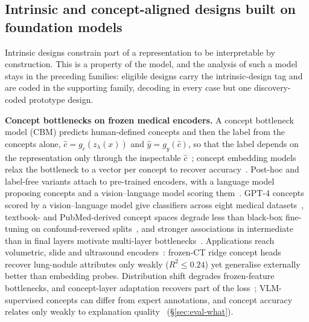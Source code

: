 \subsection{Intrinsic and concept-aligned designs built on foundation models}
\label{sec:intrinsic}

Intrinsic designs constrain part of a representation to be interpretable by construction. This is a
property of the model, and the analysis of such a model stays in the preceding families: eligible
designs carry the intrinsic-design tag and are coded in the supporting family, decoding in every case
but one discovery-coded prototype design.

\textbf{Concept bottlenecks on frozen medical encoders.} A concept bottleneck model (CBM) predicts
human-defined concepts and then the label from the concepts alone, $\hat c=g_c(z_\lambda(x))$ and
$\hat y=g_y(\hat c)$, so that the label depends on the representation only through the inspectable
$\hat c$~\cite{koh2020concept}; concept embedding models relax the bottleneck to a vector per concept to
recover accuracy~\cite{zarlenga2022concept}. Post-hoc and label-free variants attach to pre-trained
encoders, with a language model proposing concepts and a vision--language model scoring
them~\cite{yuksekgonul2022post,oikarinen2023label,yang2022language}. GPT-4 concepts scored by a
vision--language model give classifiers across eight medical datasets~\cite{yan2023robust}, textbook-
and PubMed-derived concept spaces degrade less than black-box fine-tuning on confound-reversed
splits~\cite{yang2024textbook}, and stronger associations in intermediate than in final layers motivate
multi-layer bottlenecks~\cite{wang2025mvp}. Applications reach volumetric, slide and ultrasound
encoders~\cite{rojas2026echopcbm,tushar2026distilling,gao2025evaluating,sun2025label}: frozen-CT ridge
concept heads recover lung-nodule attributes only weakly ($R^2\le 0.24$) yet generalise externally
better than embedding probes. Distribution shift degrades frozen-feature bottlenecks, and concept-layer
adaptation recovers part of the loss~\cite{choi2024adaptive}; VLM-supervised concepts can differ from
expert annotations, and concept accuracy relates only weakly to explanation
quality~\cite{debole2025if} (\S\ref{sec:eval-what}).

